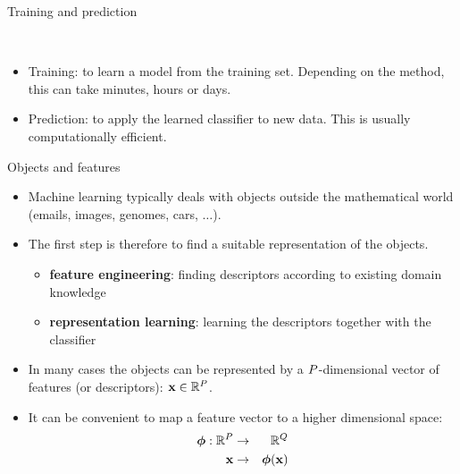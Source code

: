 \documentclass[xcolor=pdftex,dvipsnames,table]{beamer}
\begin{document}
\begin{frame}{Training and prediction}
\begin{figure}[htb]
  \centering
  \\
\end{figure}
\begin{itemize}
\item Training: to learn a model from the training set. Depending on the method, this can take minutes, hours or days.
\item Prediction: to apply the learned classifier to new data. This is usually computationally efficient.
\end{itemize}
\end{frame}

\begin{frame}{Objects and features}
\begin{itemize}
\item Machine learning typically deals with objects outside the mathematical world (emails, images, genomes, cars, $\ldots$).
\item The first step is therefore to find a suitable representation of the objects.
\begin{itemize}
\item \textbf{feature engineering}: finding descriptors according to existing domain knowledge
\item \textbf{representation learning}: learning the descriptors together with the classifier
\end{itemize}
\item In many cases the objects can be represented by a $P$-dimensional vector of features (or descriptors): $\mathbf{x} \in \mathbb{R}^{P}$.
\item It can be convenient to map a feature vector to a higher dimensional space:
\begin{eqnarray}
\boldsymbol{\phi} : \mathbb{R}^{P} &\rightarrow & \mathbb{R}^Q \\
\mathbf{x} &\rightarrow &\boldsymbol{\phi} (\mathbf{x})
\end{eqnarray}
\end{itemize}
\end{frame}
\end{document}
